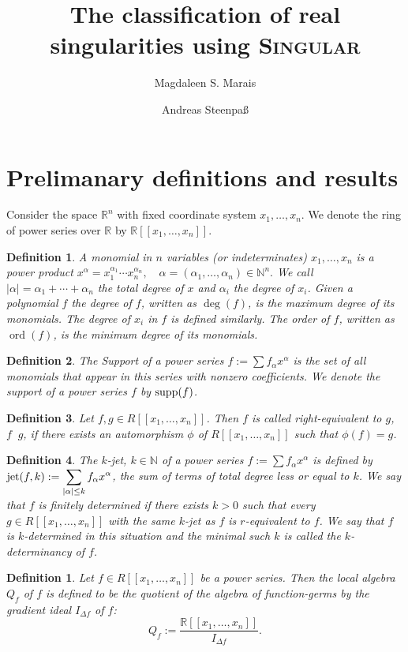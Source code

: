 \documentclass{amsproc}
\title{The classification of real singularities using \textsc{Singular}}
\author{Magdaleen S. Marais}
\author{Andreas Steenpa\ss}
\DeclareMathOperator{\ord}{ord}
\DeclareMathOperator{\requiv}{\overset{r}{\sim}}
\begin{document}
\begin{abstract}
\end{abstract}
\maketitle
\section{Prelimanary definitions and results}
Consider the space $\mathbb R^n$ with fixed coordinate system $x_1,\ldots,x_n$. We denote the ring of power series over $\mathbb R$ by $\mathbb R[[x_1,\ldots,x_n]]$.
\newtheorem{Monomial}{Definition}[section]
\begin{Monomial}\label{Monomial}
A monomial in $n$ variables (or indeterminates) $x_1,\ldots,x_n$ is a power product
$x^{\alpha}=x_1^{\alpha_1}\cdots
x_n^{\alpha_n},\quad\alpha=(\alpha_1,\ldots,\alpha_n)\in\mathbb N^n.$ We call
$|\alpha|=\alpha_1+\cdots+\alpha_n$ the total degree of $x$ and $\alpha_i$ the
degree of $x_i$. Given a polynomial $f$ the degree of $f$, written as $\deg(f)$,
is the maximum degree of its monomials. The degree of $x_i$ in $f$ is defined
similarly. The order of $f$, written as $\ord(f)$, is the minimum degree of its monomials. 
\end{Monomial}
\newtheorem{Support}[Monomial]{Definition}
\begin{Support}
The Support of a power series $f:=\sum f_\alpha  x^{\alpha}$ is the set of all monomials that appear in this series with nonzero coefficients. We denote the support of a power series $f$ by $\textnormal{supp}(f)$.
\end{Support}
\newtheorem{r-equiv}[Monomial]{Definition}
\begin{r-equiv}\label{r-equiv}
Let $f,g\in R[[x_1,\ldots,x_n]]$. Then $f$ is called right-equivalent to $g$, $f
\requiv g$, if there exists an automorphism  $\phi$ of $R[[x_1,\ldots,x_n]]$ such that $\phi(f)=g$.
\end{r-equiv}
\newtheorem{jet}[Monomial]{Definition}
\begin{jet}\label{jet}
The $k$-jet, $k\in\mathbb N$ of a power series $f:=\sum f_\alpha  x^{\alpha}$ is
defined by $\displaystyle\textnormal{jet}(f,k):=\sum_{|\alpha|\le
k}f_{\alpha}x^{\alpha}$, the sum of terms of total degree less or equal to $k$.
We say that $f$ is finitely determined if there exists $k>0$ such that every
$g\in R[[x_1,\ldots,x_n]]$ with the same $k$-jet as $f$ is $r$-equivalent to $f$.  We say that $f$ is $k$-determined in this situation and the minimal such $k$ is called the $k$-determinancy of $f$.
\end{jet}
\newtheorem{LocalAlgebra}{Definition}
\begin{LocalAlgebra}\label{LocalAlgebra}
Let $f \in R[[x_1, \ldots, x_n]]$ be a power series. Then
the local algebra $Q_f$ of $f$ is defined to be the quotient of the algebra of function-germs by the gradient ideal $I_{\Delta f}$ of $f$:
\[Q_f:=\frac{\mathbb R[[x_1,\ldots,x_n]]}{I_{\Delta f}}.\]
\end{LocalAlgebra}
\end{document}
